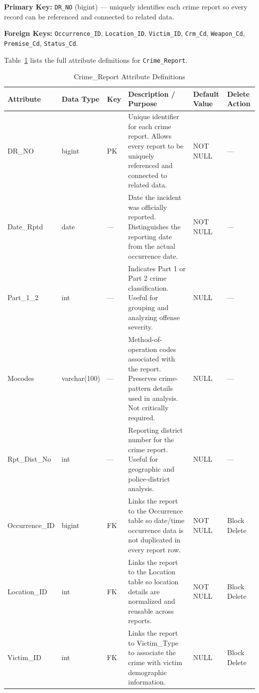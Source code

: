 \documentclass[conference]{IEEEtran}
\begin{document}
\textbf{Primary Key:} \texttt{DR\_NO} (bigint) --- uniquely identifies each crime report so every record can be referenced and connected to related data.

\textbf{Foreign Keys:} \texttt{Occurrence\_ID}, \texttt{Location\_ID}, \texttt{Victim\_ID}, \texttt{Crm\_Cd}, \texttt{Weapon\_Cd}, \texttt{Premise\_Cd}, \texttt{Status\_Cd}.

Table~\ref{tab:crime_report} lists the full attribute definitions for \texttt{Crime\_Report}.

\begin{table}[htbp]
\caption{Crime\_Report Attribute Definitions}
\label{tab:crime_report}
\begin{center}
\footnotesize
\begin{tabular}{|p{2cm}|p{2cm}|p{0.7cm}|p{6.5cm}|p{1.8cm}|p{1.8cm}|}
\hline
\textbf{Attribute} & \textbf{Data Type} & \textbf{Key} & \textbf{Description / Purpose} & \textbf{Default Value} & \textbf{Delete Action} \\
\hline
DR\_NO & bigint & PK & Unique identifier for each crime report. Allows every report to be uniquely referenced and connected to related data. & NOT NULL & --- \\
\hline
Date\_Rptd & date & --- & Date the incident was officially reported. Distinguishes the reporting date from the actual occurrence date. & NOT NULL & --- \\
\hline
Part\_1\_2 & int & --- & Indicates Part 1 or Part 2 crime classification. Useful for grouping and analyzing offense severity. & NULL & --- \\
\hline
Mocodes & varchar(100) & --- & Method-of-operation codes associated with the report. Preserves crime-pattern details used in analysis. Not critically required. & NULL & --- \\
\hline
Rpt\_Dist\_No & int & --- & Reporting district number for the crime report. Useful for geographic and police-district analysis. & NULL & --- \\
\hline
Occurrence\_ID & bigint & FK & Links the report to the Occurrence table so date/time occurrence data is not duplicated in every report row. & NOT NULL & Block Delete \\
\hline
Location\_ID & int & FK & Links the report to the Location table so location details are normalized and reusable across reports. & NOT NULL & Block Delete \\
\hline
Victim\_ID & int & FK & Links the report to Victim\_Type to associate the crime with victim demographic information. & NULL & Block Delete \\

\end{tabular}
\end{center}
\end{table}
\end{document}
